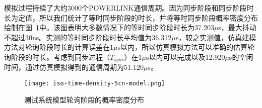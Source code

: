 模拟过程持续了大约3000个POWERLINK通信周期。因为同步阶段和同步阶段时长为定值，所以我们统计了等时同步阶段的时长，并将等时同步阶段概率密度分布绘制在图~\ref{fig:iso-time-density-5cn-model}中。该图表明大多数情况下的等时同步阶段时长为37.203$\mu$s，最大抖动不超过30ns。实测的等时同步阶段时长平均值为36.312$\mu$s，较之实测值，仿真建模方法对轮询阶段时长的计算误差在1$\mu$s以内，所以仿真模拟方法可以准确的估算轮询阶段的时长。考虑到同步过程（$T_{sync}$）在1$\mu$s以内可以完成以及12.920$\mu$s的空闲时间，通过仿真模拟得到的通信周期为51.120$\mu$s。

\begin{figure}[!htb]
  \centering
  \texttt{[image: iso-time-density-5cn-model.png]}
  \caption{测试系统模型轮询阶段的概率密度分布}
  \label{fig:iso-time-density-5cn-model}
\end{figure}







